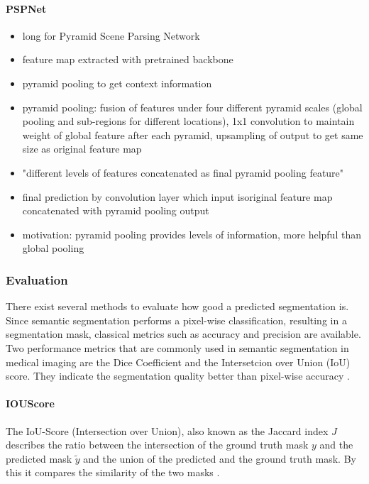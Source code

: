 \paragraph{PSPNet}

\begin{itemize}
	\item long for Pyramid Scene Parsing Network
	\item feature map extracted with pretrained backbone
	\item pyramid pooling to get context information
	\item pyramid pooling: fusion of features under four different pyramid scales (global pooling and sub-regions for different locations), 1x1 convolution to maintain weight of global feature after each pyramid, upsampling of output to get same size as original feature map
	\item "different levels of features concatenated as final pyramid pooling feature"
	\item final prediction by convolution layer which input isoriginal feature map concatenated with pyramid pooling output
	\item motivation: pyramid pooling provides levels of information, more helpful than global pooling
\end{itemize}

\subsubsection{Evaluation}

There exist several methods to evaluate how good a predicted segmentation is. Since semantic segmentation performs a pixel-wise classification, resulting in a segmentation mask, classical metrics such as accuracy and precision are available. Two performance metrics that are commonly used in semantic segmentation in medical imaging are the Dice Coefficient and the Intersetcion over Union (IoU) score. They indicate the segmentation quality better than pixel-wise accuracy \cite{Eelbode}.

\paragraph{IOUScore}

The IoU-Score (Intersection over Union), also known as the Jaccard index $J$ describes the ratio between the intersection of the ground truth mask $y$ and the predicted mask $\tilde{y}$ and the union of the predicted and the ground truth mask. By this it compares the similarity of the two masks \cite{Cho2021WeightedIO}.

